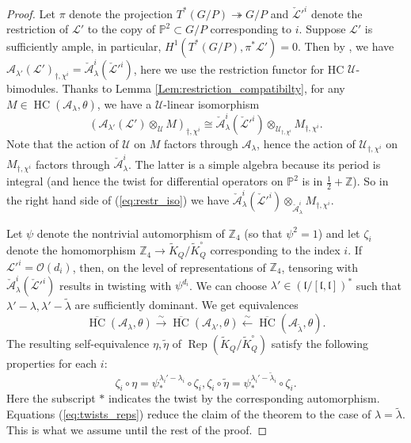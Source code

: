 \documentclass[12pt]{amsart}
\newcommand{\A}{\mathcal{A}}
\newcommand{\U}{\mathcal{U}}
\newcommand{\Z}{\mathbb{Z}}
\newcommand{\HC}{\operatorname{HC}}
\theoremstyle{definition}
\numberwithin{equation}{section}
\begin{document}
\begin{proof}
Let $\pi$ denote the projection $T^*(G/P)\twoheadrightarrow G/P$
and $\check{\mathcal{L}}'^i$ denote the restriction of $\mathcal{L}'$
to the copy of $\mathbb{P}^2\subset G/P$ corresponding to $i$.
Suppose $\mathcal{L}'$ is sufficiently ample, in particular,
$H^1(T^*(G/P),\pi^*\mathcal{L}')=0$. Then by \cite[Proposition 3.8]{Perv},
we have $\A_{\lambda'}(\mathcal{L}')_{\dagger,\chi^i}=\check{\A}^i_\lambda(\check{\mathcal{L}}'^i)$,
here we use the restriction functor for HC $\U$-bimodules.
Thanks to Lemma \ref{Lem:restriction_compatibilty}, for any $M\in \HC(\A_{\lambda},\theta)$,
we have a $\U$-linear isomorphism
\begin{equation}\label{eq:restr_iso}
\left(\A_{\lambda'}(\mathcal{L}')\otimes_{\U}M\right)_{\dagger,\chi^i}\cong
\check{\A}^i_\lambda(\check{\mathcal{L}}'^i)\otimes_{\U_{\dagger,\chi^i}}M_{\dagger,\chi^i}.
\end{equation}
Note that the action of $\U$ on $M$ factors through $\A_{\lambda}$, hence the action of
$\U_{\dagger,\chi^i}$ on $M_{\dagger,\chi^i}$ factors through $\check{\A}^i_\lambda$.
The latter is a simple algebra because its period is integral (and hence the twist for
differential operators on $\mathbb{P}^2$ is in $\frac{1}{2}+\Z$). So in the right hand side
of (\ref{eq:restr_iso}) we have $\check{\A}^i_\lambda(\check{\mathcal{L}}'^i)\otimes_{\check{\A}^i_\lambda}M_{\dagger,\chi^i}$.

Let $\psi$ denote the nontrivial automorphism of $\Z_4$ (so that $\psi^2=1$)
and let $\zeta_i$ denote the homomorphism $\Z_4\rightarrow \tilde{K}_Q/\tilde{K}_Q^\circ$
corresponding to the index $i$.
If $\mathcal{L}'^i=\mathcal{O}(d_i)$, then, on the level of representations of $\Z_4$, tensoring with $\check{\A}^i_\lambda(\check{\mathcal{L}}'^i)$ results in twisting with $\psi^{d_i}$. We can choose $\lambda'\in (\mathfrak{l}/[\mathfrak{l},\mathfrak{l}])^*$ such that $\lambda'-\lambda, \lambda'-\tilde{\lambda}$
are sufficiently dominant. We get equivalences
$$\overline{\HC}(\A_{\lambda},\theta)\xrightarrow{\sim} \overline{\HC}(\A_{\lambda'},\theta)
\xleftarrow{\sim} \overline{\HC}(\A_{\tilde{\lambda}},\theta).$$
The resulting self-equivalence $\eta,\tilde{\eta}$ of $\operatorname{Rep}(\tilde{K}_Q/\tilde{K}_Q^\circ)$ satisfy the following properties
for each $i$:
\begin{equation}\label{eq:twists_reps}
\zeta_i\circ\eta=\psi_*^{\lambda_i'-\lambda_i}\circ \zeta_i,
\zeta_i\circ\tilde{\eta}=\psi_*^{\lambda_i'-\tilde{\lambda}_i}\circ \zeta_i.
\end{equation}
Here the subscript $*$ indicates the twist by the corresponding automorphism.
Equations (\ref{eq:twists_reps}) reduce the claim of the theorem to the case of $\lambda=\tilde{\lambda}$.
This is what we assume until the rest of the proof.


\end{proof}
\end{document}
